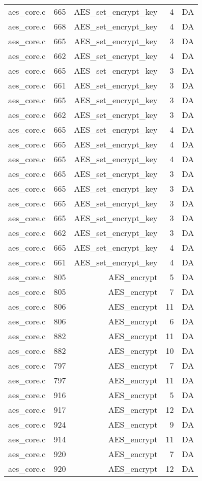 \begin{table}
\begin{tabular}{clrrr}
aes\_core.c& 665&AES\_set\_encrypt\_key&4 &DA\\
aes\_core.c& 668&AES\_set\_encrypt\_key&4 &DA\\
aes\_core.c& 665&AES\_set\_encrypt\_key&3 &DA\\
aes\_core.c& 662&AES\_set\_encrypt\_key&4 &DA\\
aes\_core.c& 665&AES\_set\_encrypt\_key&3 &DA\\
aes\_core.c& 661&AES\_set\_encrypt\_key&3 &DA\\
aes\_core.c& 665&AES\_set\_encrypt\_key&3 &DA\\
aes\_core.c& 662&AES\_set\_encrypt\_key&3 &DA\\
aes\_core.c& 665&AES\_set\_encrypt\_key&4 &DA\\
aes\_core.c& 665&AES\_set\_encrypt\_key&4 &DA\\
aes\_core.c& 665&AES\_set\_encrypt\_key&4 &DA\\
aes\_core.c& 665&AES\_set\_encrypt\_key&3 &DA\\
aes\_core.c& 665&AES\_set\_encrypt\_key&3 &DA\\
aes\_core.c& 665&AES\_set\_encrypt\_key&3 &DA\\
aes\_core.c& 665&AES\_set\_encrypt\_key&3 &DA\\
aes\_core.c& 662&AES\_set\_encrypt\_key&3 &DA\\
aes\_core.c& 665&AES\_set\_encrypt\_key&4 &DA\\
aes\_core.c& 661&AES\_set\_encrypt\_key&4 &DA\\
aes\_core.c& 805&AES\_encrypt&5 &DA\\
aes\_core.c& 805&AES\_encrypt&7 &DA\\
aes\_core.c& 806&AES\_encrypt&11&DA\\
aes\_core.c& 806&AES\_encrypt&6 &DA\\
aes\_core.c& 882&AES\_encrypt&11&DA\\
aes\_core.c& 882&AES\_encrypt&10&DA\\
aes\_core.c& 797&AES\_encrypt&7 &DA\\
aes\_core.c& 797&AES\_encrypt&11&DA\\
aes\_core.c& 916&AES\_encrypt&5 &DA\\
aes\_core.c& 917&AES\_encrypt&12&DA\\
aes\_core.c& 924&AES\_encrypt&9 &DA\\
aes\_core.c& 914&AES\_encrypt&11&DA\\
aes\_core.c& 920&AES\_encrypt&7 &DA\\
aes\_core.c& 920&AES\_encrypt&12&DA\\

\end{tabular}
\end{table}
